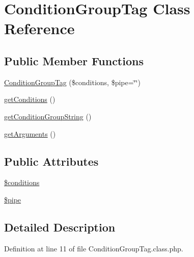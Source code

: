 \hypertarget{classConditionGroupTag}{\section{Condition\-Group\-Tag Class Reference}
\label{classConditionGroupTag}
}
\subsection*{Public Member Functions}
\begin{DoxyCompactItemize}
\item 
\hyperlink{classConditionGroupTag_a8fc7849474c6d2438761a4677d4dc3b7}{Condition\-Group\-Tag} (\$conditions, \$pipe=\char`\"{}\char`\"{})
\item 
\hyperlink{classConditionGroupTag_a7c73e801b9044cacf7bdfdcd718d4939}{get\-Conditions} ()
\item 
\hyperlink{classConditionGroupTag_a7bf3bb17f13f21b6c2765dced1638d85}{get\-Condition\-Group\-String} ()
\item 
\hyperlink{classConditionGroupTag_a39eb41f124f6a58e4afe873c2cb4ce6e}{get\-Arguments} ()
\end{DoxyCompactItemize}
\subsection*{Public Attributes}
\begin{DoxyCompactItemize}
\item 
\hyperlink{classConditionGroupTag_a19efbd0ebcee51dbec82581f0044fb1f}{\$conditions}
\item 
\hyperlink{classConditionGroupTag_af3040978080a9af0e9f8760eb05cc58b}{\$pipe}
\end{DoxyCompactItemize}


\subsection{Detailed Description}


Definition at line 11 of file Condition\-Group\-Tag.\-class.\-php.



